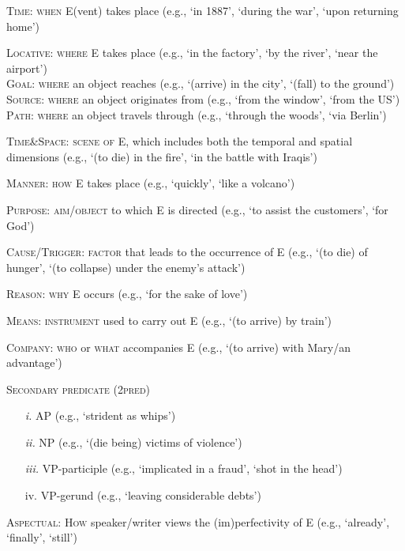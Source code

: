 \documentclass[output=paper,colorlinks,citecolor=brown,
]{langscibook}
\begin{document}
\begin{exe} %
    \ex\label{ex:nishida:8} 
    \begin{xlist} 
        \ex\label{ex:nishida:8a}  \textsc{Time: when E}(vent) takes place (e.g., `in 1887', `during the war', `upon returning home')  
          
        \ex\label{ex:nishida:8b}  \textsc{Locative: where E} takes place (e.g., `in the factory', `by the river', `near the airport')\\
        \textsc{Goal: where} an object reaches (e.g., `(arrive) in the city', `(fall) to the ground')\\
        \textsc{Source: where} an object originates from (e.g., `from the window', `from the US')\\
        \textsc{Path: where} an object travels through (e.g., `through the woods', `via Berlin')
        
        \ex\label{ex:nishida:8c}  \textsc{Time\&Space: scene of E}, which includes both the temporal and spatial dimensions (e.g., 
		`(to die) in the fire', `in the battle with Iraqis')
		
		\ex\label{ex:nishida:8d}   \textsc{Manner: how E} takes place (e.g., `quickly', `like a volcano')
		
		\ex\label{ex:nishida:8e}   \textsc{Purpose: aim/object} to which E is directed (e.g., `to assist the customers', `for God')
		
		\ex\label{ex:nishida:8f}  \textsc{Cause/Trigger: factor} that leads to the occurrence of E (e.g., `(to die) of hunger', `(to 			collapse) under the enemy's attack')
		
		\ex\label{ex:nishida:8g}  \textsc{Reason: why E} occurs (e.g., `for the sake of love')
		
		\ex\label{ex:nishida:8h}   \textsc{Means: instrument} used to carry out E (e.g., `(to arrive) by train')
		
		\ex\label{ex:nishida:8i}   \textsc{Company: who} or \textsc{what} accompanies E (e.g., `(to arrive) with Mary/an advantage')	 
		
		\ex\label{ex:nishida:8j}   \textsc{Secondary predicate (2pred)}
		\begin{itemize}
		    \item[\textit{i.}] AP (e.g., `strident as whips')
		    \item[\textit{ii.}] 	NP (e.g., `(die being) victims of violence')
		    \item[\textit{iii.}]  VP-participle (e.g., `implicated in a fraud', `shot in the head') 
		    \item[iv.] VP-gerund (e.g., `leaving considerable debts')
		\end{itemize}
		
		\ex\label{ex:nishida:8k}  \textsc{Aspectual: How} speaker/writer views the (im)perfectivity of E (e.g., `already', `finally', `still')
\end{xlist}
\end{exe}
\end{document}
